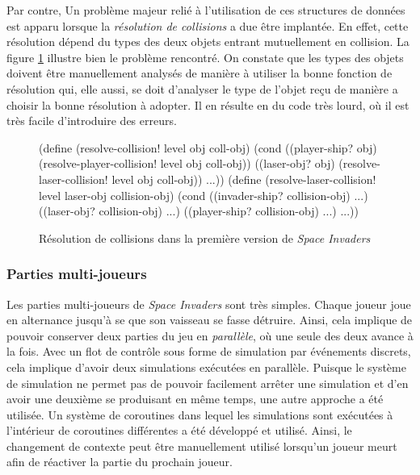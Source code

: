 \documentclass[12pt,twoside,letterpaper,francais]{book}
\newcommand{\si}{{\textit{Space Invaders }}}
\begin{document}
Par contre, Un problème majeur relié à l'utilisation de ces structures
de données est apparu lorsque la \emph{résolution de collisions} a due
être implantée. En effet, cette résolution dépend du types des deux
objets entrant mutuellement en collision. La figure
\ref{Exp:si1-col-res} illustre bien le problème rencontré. On constate
que les types des objets doivent être manuellement analysés de manière
à utiliser la bonne fonction de résolution qui, elle aussi, se doit
d'analyser le type de l'objet reçu de manière a choisir la bonne
résolution à adopter. Il en résulte en du code très lourd, où il est
très facile d'introduire des erreurs.

\begin{figure}[htb!]
  \begin{schemecode}
(define (resolve-collision! level obj coll-obj)
  (cond
   ((player-ship? obj) (resolve-player-collision! level obj coll-obj))
   ((laser-obj? obj) (resolve-laser-collision! level obj coll-obj))
   ...))
(define (resolve-laser-collision! level laser-obj collision-obj)
  (cond ((invader-ship? collision-obj) ...)
        ((laser-obj? collision-obj) ...)
        ((player-ship? collision-obj) ...)
        ...))
  \end{schemecode}
  \caption{Résolution de collisions dans la première version de \si}
  \label{Exp:si1-col-res}
\end{figure}


\FloatBarrier
\subsubsection{Parties multi-joueurs}
Les parties multi-joueurs de \si sont très simples. Chaque joueur joue
en alternance jusqu'à se que son vaisseau se fasse détruire. Ainsi,
cela implique de pouvoir conserver deux parties du jeu en
\emph{parallèle}, où une seule des deux avance à la fois. Avec un flot
de contrôle sous forme de simulation par événements discrets, cela
implique d'avoir deux simulations exécutées en parallèle. Puisque le
système de simulation ne permet pas de pouvoir facilement arrêter une
simulation et d'en avoir une deuxième se produisant en même temps, une
autre approche a été utilisée. Un système de coroutines dans lequel
les simulations sont exécutées à l'intérieur de coroutines différentes
a été développé et utilisé. Ainsi, le changement de contexte peut être
manuellement utilisé lorsqu'un joueur meurt afin de réactiver la
partie du prochain joueur.
\end{document}
